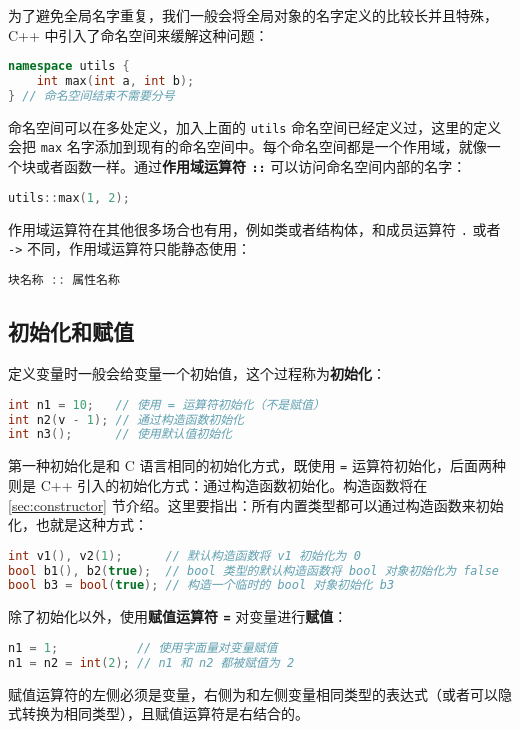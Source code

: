 \documentclass[hyperref,UTF8]{article}
\begin{document}
为了避免全局名字重复，我们一般会将全局对象的名字定义的比较长并且特殊，C++ 中引入了命名空间来缓解这种问题：
\begin{lstlisting}[language=c++]
namespace utils {
    int max(int a, int b);
} // 命名空间结束不需要分号
\end{lstlisting}
命名空间可以在多处定义，加入上面的 \texttt{utils} 命名空间已经定义过，这里的定义会把 \texttt{max} 名字添加到现有的命名空间中。每个命名空间都是一个作用域，就像一个块或者函数一样。通过\textbf{作用域运算符 \texttt{::}} 可以访问命名空间内部的名字：
\begin{lstlisting}[language=c++,numbers=none]
utils::max(1, 2);
\end{lstlisting}
作用域运算符在其他很多场合也有用，例如类或者结构体，和成员运算符 \texttt{.} 或者 \texttt{->} 不同，作用域运算符只能静态使用：
\begin{lstlisting}[language=c++,numbers=none]
块名称 :: 属性名称
\end{lstlisting}

\subsection{初始化和赋值}

定义变量时一般会给变量一个初始值，这个过程称为\textbf{初始化}：
\begin{lstlisting}[language=c++]
int n1 = 10;   // 使用 = 运算符初始化（不是赋值）
int n2(v - 1); // 通过构造函数初始化
int n3();      // 使用默认值初始化
\end{lstlisting}
第一种初始化是和 C 语言相同的初始化方式，既使用 \texttt{=} 运算符初始化，后面两种则是 C++ 引入的初始化方式：通过构造函数初始化。构造函数将在 \ref{sec:constructor} 节介绍。这里要指出：所有内置类型都可以通过构造函数来初始化，也就是这种方式：
\begin{lstlisting}[language=c++]
int v1(), v2(1);      // 默认构造函数将 v1 初始化为 0
bool b1(), b2(true);  // bool 类型的默认构造函数将 bool 对象初始化为 false
bool b3 = bool(true); // 构造一个临时的 bool 对象初始化 b3
\end{lstlisting}

除了初始化以外，使用\textbf{赋值运算符 \texttt{=}} 对变量进行\textbf{赋值}：
\begin{lstlisting}[language=c++]
n1 = 1;           // 使用字面量对变量赋值
n1 = n2 = int(2); // n1 和 n2 都被赋值为 2
\end{lstlisting}
赋值运算符的左侧必须是变量，右侧为和左侧变量相同类型的表达式（或者可以隐式转换为相同类型），且赋值运算符是右结合的。
\end{document}
